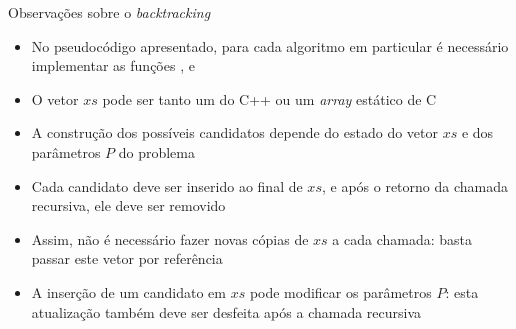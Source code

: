 \begin{frame}[fragile]{Observações sobre o {\it backtracking}}

    \begin{itemize}
        \item No pseudocódigo apresentado, para cada algoritmo em particular é necessário
            implementar as funções ,  e

        \item O vetor $xs$ pode ser tanto um  do C++ ou um \textit{array} 
            estático de C

        \item A construção dos possíveis candidatos depende do estado do vetor $xs$ e dos
            parâmetros $P$ do problema

        \item Cada candidato deve ser inserido ao final de $xs$, e após o retorno da chamada
            recursiva, ele deve ser removido

        \item Assim, não é necessário fazer novas cópias de $xs$ a cada chamada: basta passar este
            vetor por referência

        \item A inserção de um candidato em $xs$ pode modificar os parâmetros $P$: esta
            atualização também deve ser desfeita após a chamada recursiva
    \end{itemize}

\end{frame}
